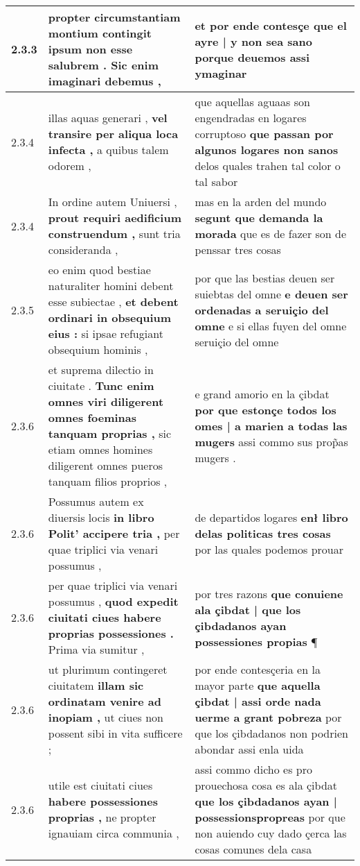 \begin{tabular}{|p{1cm}|p{6.5cm}|p{6.5cm}|}
2.3.3 & propter circumstantiam montium contingit \textbf{ ipsum non esse salubrem . } Sic enim imaginari debemus , & et por ende contesçe \textbf{ que el ayre | y non sea sano } porque deuemos assi ymaginar \\\hline
2.3.4 & illas aquas generari , \textbf{ vel transire per aliqua loca infecta , } a quibus talem odorem , & que aquellas aguaas son engendradas en logares corruptoso \textbf{ que passan por algunos logares non sanos } delos quales trahen tal color o tal sabor \\\hline
2.3.4 & In ordine autem Uniuersi , \textbf{ prout requiri aedificium construendum , } sunt tria consideranda , & mas en la arden del mundo \textbf{ segunt que demanda la morada } que es de fazer son de penssar tres cosas \\\hline
2.3.5 & eo enim quod bestiae naturaliter homini debent esse subiectae , \textbf{ et debent ordinari in obsequium eius : } si ipsae refugiant obsequium hominis , & por que las bestias deuen ser suiebtas del omne \textbf{ e deuen ser ordenadas a seruiçio del omne } e si ellas fuyen del omne seruiçio del omne \\\hline
2.3.6 & et suprema dilectio in ciuitate . \textbf{ Tunc enim omnes viri diligerent omnes foeminas tanquam proprias , } sic etiam omnes homines diligerent omnes pueros tanquam filios proprios , & e grand amorio en la çibdat \textbf{ por que estonçe todos los omes | a marien a todas las mugers } assi commo sus prop̃as mugers . \\\hline
2.3.6 & Possumus autem ex diuersis locis \textbf{ in libro Polit’ accipere tria , } per quae triplici via venari possumus , & de departidos logares \textbf{ enł libro delas politicas tres cosas } por las quales podemos prouar \\\hline
2.3.6 & per quae triplici via venari possumus , \textbf{ quod expedit ciuitati ciues habere proprias possessiones . } Prima via sumitur , & por tres razons \textbf{ que conuiene ala çibdat | que los çibdadanos ayan possessiones propias } ¶ \\\hline
2.3.6 & ut plurimum contingeret ciuitatem \textbf{ illam sic ordinatam venire ad inopiam , } ut ciues non possent sibi in vita sufficere ; & por ende contesçeria en la mayor parte \textbf{ que aquella çibdat | assi orde nada uerme a grant pobreza } por que los çibdadanos non podrien abondar assi enla uida \\\hline
2.3.6 & utile est ciuitati ciues \textbf{ habere possessiones proprias , } ne propter ignauiam circa communia , & assi commo dicho es pro prouechosa cosa es ala çibdat \textbf{ que los çibdadanos ayan | possessionspropreas } por que non auiendo cuy dado çerca las cosas comunes dela casa \\\hline

\end{tabular}
